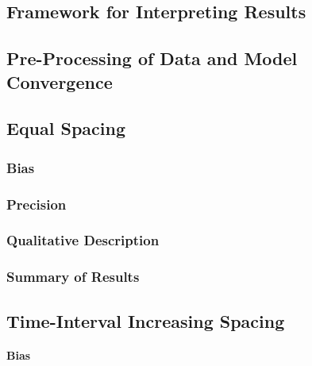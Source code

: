 \documentclass[
12pt, %
twoside,
english]{guelphthesis}
\begin{document}
\hypertarget{framework-for-interpreting-results-1}{%
\subsection{Framework for Interpreting Results}\label{framework-for-interpreting-results-1}}

\hypertarget{pre-processing-of-data-and-model-convergence-1}{%
\subsection{Pre-Processing of Data and Model Convergence}\label{pre-processing-of-data-and-model-convergence-1}}

\hypertarget{concise-example}{%
\subsection{Equal Spacing}\label{concise-example}}

\hypertarget{bias-equal-exp2}{%
\subsubsection{Bias}\label{bias-equal-exp2}}

\hypertarget{precision-equal-exp2}{%
\subsubsection{Precision}\label{precision-equal-exp2}}

\hypertarget{qualitative-equal-exp2}{%
\subsubsection{Qualitative Description}\label{qualitative-equal-exp2}}

\hypertarget{summary-of-results-4}{%
\subsubsection{Summary of Results}\label{summary-of-results-4}}

\hypertarget{time-interval-increasing-spacing-1}{%
\subsection{Time-Interval Increasing Spacing}\label{time-interval-increasing-spacing-1}}

\hypertarget{bias-time-inc-exp2}{%
\paragraph{Bias}\label{bias-time-inc-exp2}}
\end{document}
